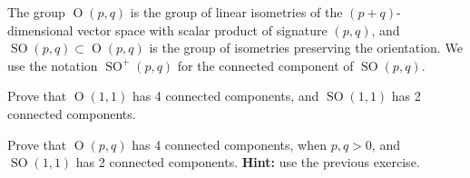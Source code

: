 \documentclass{article}
\numberwithin{equation}{section}
\renewcommand{\O}{\operatorname{O}}
\DeclareMathOperator{\SO}{SO}
\begin{document}
	\begin{defn}
		The group $\O(p,q)$ is the group of linear isometries of the $(p+q)$-dimensional vector space with scalar product of signature $(p,q)$, and $\SO(p,q)\subset\O(p,q)$ is the group of isometries preserving the orientation. We use the notation $\SO^+(p,q)$ for the connected component of $\SO(p,q)$.
	\end{defn}
	\begin{exercise}\label{ex:2.2}
		Prove that $\O(1,1)$ has 4 connected components, and $\SO(1,1)$ has 2 connected components.
	\end{exercise}
	\begin{exercise}\label{ex:2.3}
		Prove that $\O(p,q)$ has 4 connected components, when $p,q>0$, and $\SO(1,1)$ has 2 connected components. \textbf{Hint:} use the previous exercise.
	\end{exercise}
\end{document}
